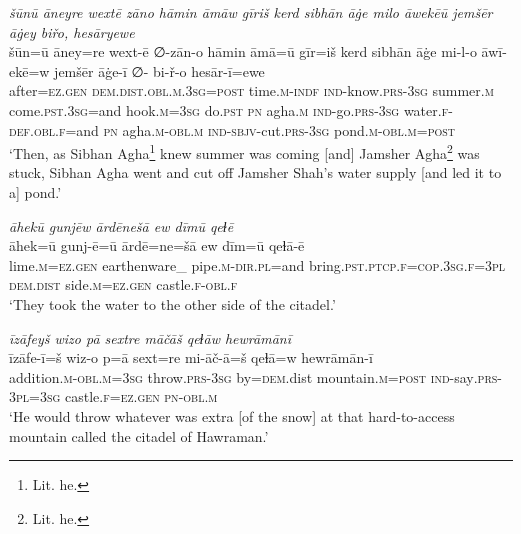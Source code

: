 \ea \label{DP.30}
\textit{šūnū āneyre wextē zāno hāmin āmāw gīriš kerd sibhān āġe milo āwekēū jemšēr āġey biřo, hesāryewe} \\ 
\gll šūn=ū āney=re wext-ē ∅-zān-o hāmin āmā=ū gīr=iš kerd sibhān āġe mi-l-o āwī-ekē=w jemšēr āġe-ī ∅- bi-ř-o hesār-ī=ewe \\ 
 after\textsc{=ez}\textsc{.gen} \textsc{dem.dist}\textsc{.obl}\textsc{.m}\textsc{.3sg}\textsc{=\textsc{post}} time\textsc{.m}\textsc{-indf} \textsc{ind-}know\textsc{.prs}\textsc{-3sg} summer\textsc{.m} come\textsc{.pst}\textsc{.3sg}=and hook\textsc{.m}\textsc{=3sg} do\textsc{.pst} \textsc{pn} agha\textsc{.m} \textsc{ind-}go\textsc{.prs}\textsc{-3sg} water\textsc{\textsc{.f}}\textsc{-def}\textsc{.obl}\textsc{\textsc{.f}}=and \textsc{pn} agha\textsc{.m}\textsc{-obl}\textsc{.m} \textsc{ind-}\textsc{sbjv-}cut\textsc{.prs}\textsc{-3sg} pond\textsc{.m}\textsc{-obl}\textsc{.m}\textsc{=\textsc{post}} \\ 
\glt `Then, as Sibhan Agha\footnote{Lit. he.} knew summer was coming [and] Jamsher Agha\footnote{Lit. he.} was stuck, Sibhan Agha went and cut off Jamsher Shah’s water supply [and led it to a] pond.'
\z 
 
\ea \label{DP.32}
\textit{āhekū gunjēw ārdēnešā ew dīmū qeɫē} \\ 
\gll āhek=ū gunj-ē=ū ārdē=ne=šā ew dīm=ū qeɫā-ē \\ 
 lime\textsc{.m}\textsc{=ez}\textsc{.gen} earthenware\_ pipe\textsc{.m}\textsc{-dir}\textsc{.pl}=and bring\textsc{.pst}\textsc{.ptcp}\textsc{\textsc{.f}}\textsc{=cop}\textsc{.3sg}\textsc{\textsc{.f}}\textsc{=3pl} \textsc{dem.dist} side\textsc{.m}\textsc{=ez}\textsc{.gen} castle\textsc{\textsc{.f}}\textsc{-obl}\textsc{\textsc{.f}} \\ 
\glt `They took the water to the other side of the citadel.'
\z 
 
\ea \label{DP.35}
\textit{īzāfeyš wizo pā sextre māčāš qeɫāw hewrāmānī} \\ 
\gll īzāfe-ī=š wiz-o p=ā sext=re mi-āč-ā=š qeɫā=w hewrāmān-ī \\ 
 addition\textsc{.m}\textsc{-obl}\textsc{.m}\textsc{=3sg} throw\textsc{.prs}\textsc{-3sg} by\textsc{=dem}.dist mountain\textsc{.m}\textsc{=\textsc{post}} \textsc{ind-}say\textsc{.prs}\textsc{-3pl}\textsc{=3sg} castle\textsc{\textsc{.f}}\textsc{=ez}\textsc{.gen} \textsc{pn}\textsc{-obl}\textsc{.m} \\ 
\glt `He would throw whatever was extra [of the snow] at that hard-to-access mountain called the citadel of Hawraman.'
\z 
 
